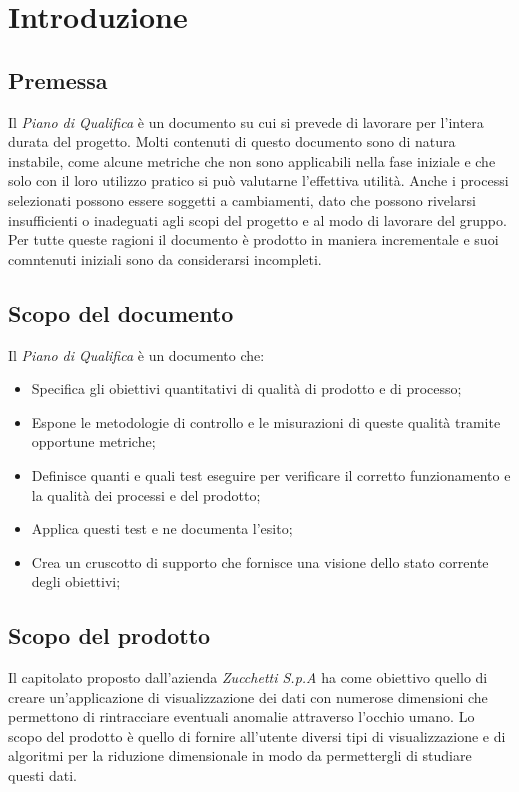 \chapter{Introduzione}
\section{Premessa}
Il \textit{Piano di Qualifica} è un documento su cui si prevede di lavorare per l'intera durata del progetto. Molti contenuti di questo documento sono di natura instabile, come alcune metriche che non sono applicabili nella fase iniziale e che solo con il loro utilizzo pratico si può valutarne l'effettiva utilità. Anche i processi selezionati possono essere soggetti a cambiamenti, dato che possono rivelarsi insufficienti o inadeguati agli scopi del progetto e al modo di lavorare del gruppo.
Per tutte queste ragioni il documento è prodotto in maniera incrementale e suoi comntenuti iniziali sono da considerarsi incompleti.

\section{Scopo del documento}
Il \textit{Piano di Qualifica} è un documento che:
\begin{itemize}
    \item Specifica gli obiettivi
    quantitativi di qualità di prodotto e di processo;
    \item Espone le
    metodologie di controllo e le misurazioni di queste qualità tramite
    opportune metriche;
    \item Definisce quanti e quali test eseguire per verificare il corretto funzionamento
    e la qualità dei processi e del prodotto;
    \item Applica questi test e ne documenta l'esito;
    \item Crea un cruscotto di supporto che fornisce
    una visione dello stato corrente degli obiettivi;
\end{itemize}
\section{Scopo del prodotto}
Il capitolato proposto dall'azienda \textit{Zucchetti S.p.A} ha come obiettivo quello di creare un'applicazione di visualizzazione dei dati con numerose dimensioni che permettono di rintracciare eventuali anomalie attraverso l'occhio umano. Lo scopo del prodotto è quello di fornire all'utente diversi tipi di visualizzazione e di algoritmi per la riduzione dimensionale in modo da permettergli di studiare questi dati.
